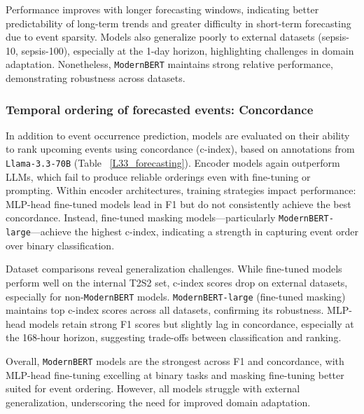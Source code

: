 Performance improves with longer forecasting windows, indicating better predictability of long-term trends and greater difficulty in short-term forecasting due to event sparsity. Models also generalize poorly to external datasets (sepsis-10, sepsis-100), especially at the 1-day horizon, highlighting challenges in domain adaptation. Nonetheless, \texttt{ModernBERT} maintains strong relative performance, demonstrating robustness across datasets.

\subsubsection{Temporal ordering of forecasted events: Concordance} In addition to event occurrence prediction, models are evaluated on their ability to rank upcoming events using concordance (c-index), based on annotations from \texttt{Llama-3.3-70B} (Table ~\ref{L33_forecasting}). Encoder models again outperform LLMs, which fail to produce reliable orderings even with fine-tuning or prompting. Within encoder architectures, training strategies impact performance: MLP-head fine-tuned models lead in F1 but do not consistently achieve the best concordance. Instead, fine-tuned masking models—particularly \texttt{ModernBERT-large}—achieve the highest c-index, indicating a strength in capturing event order over binary classification.

Dataset comparisons reveal generalization challenges. While fine-tuned models perform well on the internal T2S2 set, c-index scores drop on external datasets, especially for non-\texttt{ModernBERT} models. \texttt{ModernBERT-large} (fine-tuned masking) maintains top c-index scores across all datasets, confirming its robustness. MLP-head models retain strong F1 scores but slightly lag in concordance, especially at the 168-hour horizon, suggesting trade-offs between classification and ranking.

Overall, \texttt{ModernBERT} models are the strongest across F1 and concordance, with MLP-head fine-tuning excelling at binary tasks and masking fine-tuning better suited for event ordering. However, all models struggle with external generalization, underscoring the need for improved domain adaptation.